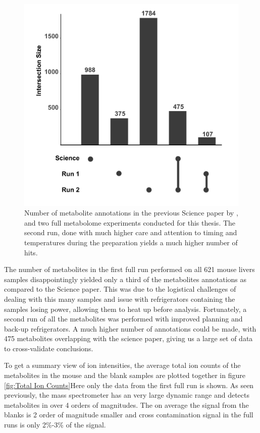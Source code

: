 \documentclass[a4paper,11pt,twoside]{book}
\begin{document}
\begin{figure}[bht!]
		\centering
		\includegraphics[width=0.7\linewidth]{3.Metabolomics/Metabolite_Set_Overlap}
		\caption{ Number of metabolite annotations in the previous Science paper by \citeauthor{Williams2016SystemsFunction}, and two full metabolome experiments conducted for this thesis. The second run, done with much higher care and attention to timing and temperatures during the preparation yields a much higher number of hits.}
		\label{fig:Unique Metabolite Annotations}
\end{figure}

The number of metabolites in the first full run performed on all 621 mouse livers samples disappointingly yielded only a third of the metabolites annotations as compared to the Science paper. This was due to the logistical challenges of dealing with this many samples and issue with refrigerators containing the samples losing power, allowing them to heat up before analysis. Fortunately, a second run of all the metabolites was performed with improved planning and back-up refrigerators. A much higher number of annotations could be made, with 475 metabolites overlapping with the science paper, giving us a large set of data to cross-validate conclusions.
	
To get a summary view of ion intensities, the average total ion counts of the metabolites in the mouse and the blank samples are plotted together in figure \ref{fig:Total Ion Counts}Here only the data from the first full run is shown. As seen previously, the mass spectrometer has an very large dynamic range and detects metabolites in over 4 orders of magnitudes. The on average the signal from the blanks is 2 order of magnitude smaller and cross contamination signal in the full runs is only 2\%-3\% of the signal.
	
\end{document}
